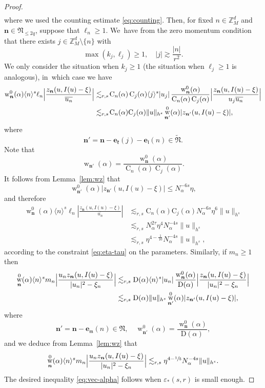 \documentclass[10pt,a4paper]{amsart}
\DeclareMathOperator{\rw}{w}
\theoremstyle{plain}
\theoremstyle{definition}
\newcommand{\nb}{{\boldsymbol n}}
\newcommand{\Nb}{{\boldsymbol{\mathfrak{N}}}}
\newcommand{\Z}{\mathbb{Z}}
\newcommand{\1}{\mathbf{1}}
\let\epsilon\varepsilon
\begin{document}
\begin{proof}
\begin{equation*}
\begin{split}
\end{split}
\end{equation*}
where we used the counting estimate \eqref{eq:counting}. Then, for fixed $n\in\Z_{M}^{d}$ and $\nb\in\Nb_{\leq2q}$, suppose that $\ell_{n}\geq1$. We~have from the zero momentum condition that there exists $j\in\Z_{M}^{d}\setminus\{n\}$ with
\[
\max(k_{j},\ell_{j})\geq1,\quad |j|\gtrsim \frac{|n|}{r^{2}}.
\]
We only consider the situation when $k_{j}\geq1$ (the situation when $\ell_{j}\geq1$ is analogous), in~which case we have
\begin{align*}
\operatorname{w}_{\nb}^{0}(\alpha)\langle n\rangle^{s}\ell_{n}\Bigl|\frac{z_{\nb}(u,I(u)-\xi)}{\overline{u_{n}}}\Bigr|
&\lesssim_{r,s}\!\operatorname{C}_{n}(\alpha)\operatorname{C}_{j}(\alpha)\langle j\rangle^{s}|u_{j}|\,\frac{\rw_{\nb}^{0}(\alpha)}{\operatorname{C}_{n}(\alpha)\operatorname{C}_{j}(\alpha)}\Bigl|\frac{z_{\nb}(u,I(u)-\xi)}{u_{j}\overline{u_{n}}}\Bigr|\\
&\lesssim_{r,s}\!\mathrm{C}_{n}(\alpha)\mathrm{C}_{j}(\alpha)\|u\|_{h^{s}}\rw_{\nb'}^{0}(\alpha)|z_{\nb'}(u,I(u)-\xi)|,
\end{align*}
where
\[
\nb' = \nb - \boldsymbol{e}_{\mathfrak{k}}(j) - \boldsymbol{e}_{\mathfrak{l}}(n) \in \widetilde{\Nb}.
\]
Note that
\[
\rw_{\nb'}(\alpha)=\frac{\rw_{\nb}^{0}(\alpha)}{\operatorname{C}_{n}(\alpha)\operatorname{C}_{j}(\alpha)}.
\]
It follows from Lemma~\ref{lem:wz} that
\[
\operatorname{w}_{\nb'}^{0}(\alpha)|z_{\nb'}(u,I(u)-\xi)| \leq N_{\alpha}^{-6s}\eta,
\]
and therefore
\begin{align*}
\operatorname{w}_{\nb}^{0}(\alpha)\langle n\rangle^{s}\ell_{n}|\frac{z_{\nb}(u,I(u)-\xi)}{\overline{u_{n}}}|
&\lesssim_{r,s} \mathrm{C}_{n}(\alpha)\mathrm{C}_{j}(\alpha) N_{\alpha}^{-6s}\eta^{6} \|u\|_{h^{s}} \\
&\lesssim_{r,s} N_{\alpha}^{2\tau} \eta^{4}N_{\alpha}^{-4s}\|u\|_{h^{s}} \\
&\lesssim_{r,s}\eta^{4-\frac{1}{10}}N_{\alpha}^{-4s}\|u\|_{h^{s}},
\end{align*}
according to the constraint \eqref{eq:eta-tau} on the parameters. Similarly, if $m_{n}\geq1$ then
\begin{align*}
\rw_{\nb}^{0}(\alpha)\langle n\rangle^{s}m_{n}\Bigl|\frac{u_{n}z_{\nb}(u,I(u)-\xi)}{|u_{n}|^{2}-\xi_{n}}\Bigr|
&\lesssim_{r,s}\mathrm{D}(\alpha)\langle n\rangle^{s}|u_{n}|\, \frac{\rw_{\nb}^{0}(\alpha)}{\mathrm{D}(\alpha)}\Bigl|\frac{z_{\nb}(u,I(u)-\xi)}{|u_n|^{2}-\xi_{n}}\Bigr| \\
&\lesssim_{r,s}\mathrm{D}(\alpha)\|u\|_{h^{s}} \rw_{\nb'}^{0}(\alpha)|z_{\nb'}(u,I(u)-\xi)|,
\end{align*}
where
\[
\nb' = \nb - \boldsymbol{e}_{\mathfrak{m}}(n) \in \Nb,\quad \rw_{\nb'}^{0}(\alpha)= \frac{\rw_{\nb}^{0}(\alpha)}{\mathrm{D}(\alpha)},
\]
and we deduce from Lemma~\ref{lem:wz} that
\[
\rw_{\nb}^{0}(\alpha)\langle n\rangle^{s}m_{n}\Bigl|\frac{u_{n}z_{\nb}(u,I(u)-\xi)}{|u_{n}|^{2}-\xi_{n}}\Bigr|
\lesssim_{r,s}\eta^{4-\sfrac{1}{5}}N_{\alpha}^{-4s}\|u\|_{h^{s}}.
\]
The desired inequality \eqref{eq:vec-alpha} follows when $\epsilon_{\ast}(s,r)$ is small enough.
\end{proof}
\end{document}

